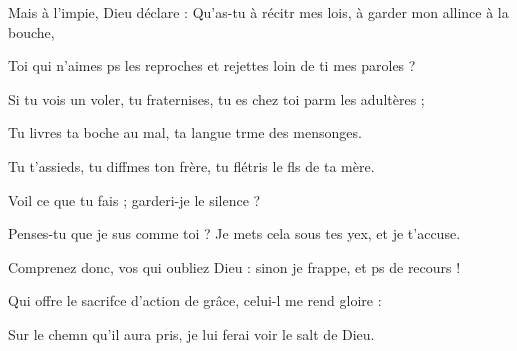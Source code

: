 \item Mais à l’impie, Dieu déclare :\pscross{} Qu’as-tu à récitr mes lois,\psstar{} à garder mon allince à la bouche,
\item Toi qui n’aimes ps les reproches\psstar{} et rejettes loin de ti mes paroles ?
\item Si tu vois un voler, tu fraternises,\psstar{} tu es chez toi parm les adultères ;
\item Tu livres ta boche au mal,\psstar{} ta langue trme des mensonges.
\item Tu t’assieds, tu diffmes ton frère,\psstar{} tu flétris le fls de ta mère.
\item Voil ce que tu fais ;\psstar{} garderi-je le silence ? 
\item Penses-tu que je sus comme toi ?\psstar{} Je mets cela sous tes yex, et je t’accuse.
\item Comprenez donc, vos qui oubliez Dieu :\psstar{} sinon je frappe, et ps de recours !
\item Qui offre le sacrifce d’action de grâce,\psstar{} celui-l me rend gloire : 
\item Sur le chemn qu’il aura pris,\psstar{} je lui ferai voir le salt de Dieu.
